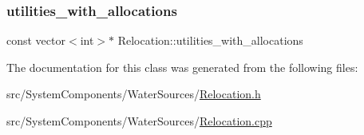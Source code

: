 \mbox{\label{classRelocation_ae426f390487b6b67f19bfbf556c922c2_ae426f390487b6b67f19bfbf556c922c2}} 
\subsubsection{\texorpdfstring{utilities\+\_\+with\+\_\+allocations}{utilities\_with\_allocations}}
{\footnotesize\ttfamily const vector$<$int$>$$\ast$ Relocation\+::utilities\+\_\+with\+\_\+allocations}



The documentation for this class was generated from the following files\+:\begin{DoxyCompactItemize}
\item 
src/\+System\+Components/\+Water\+Sources/\mbox{\hyperlink{Relocation_8h}{Relocation.\+h}}\item 
src/\+System\+Components/\+Water\+Sources/\mbox{\hyperlink{Relocation_8cpp}{Relocation.\+cpp}}\end{DoxyCompactItemize}
